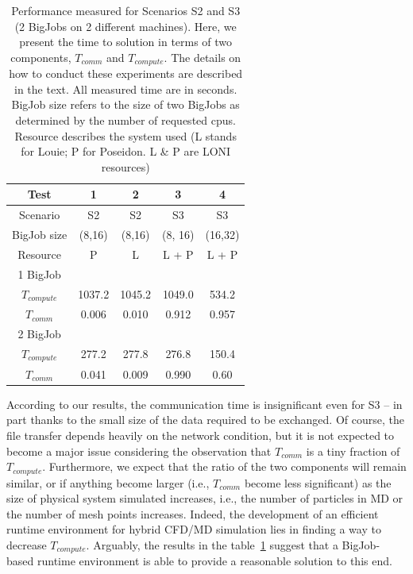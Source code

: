 \documentclass[conference,final]{IEEEtran}
\newcommand{\jhanote}[1]{ {\textcolor{red} { ***Jha: #1 }}}
\newcommand{\jhanote}[1]{}
\begin{document}
\begin{table}[!h]
\begin{center}
  \caption{\small Performance measured for Scenarios S2 and S3 (2
    BigJobs on 2 different machines).  Here, we present the time to
    solution in terms of two components, ${T_{comm}}$ and
   ${T_{compute}}$.  The details on how to conduct these experiments
    are described in the text.  All measured time are in seconds.
    BigJob size refers to the size of two BigJobs as determined by the
    number of requested cpus. Resource describes the system used (L
    stands for Louie; P for Poseidon. L \& P are LONI resources) }
\label{table:TwoBigJobs}
\begin{tabular}{ c || c  c  c  c}
\hline
Test & 1 & 2 & 3 & 4  \\

\hline
Scenario & S2 & S2 & S3 & S3 \\
BigJob size & (8,16)  & (8,16) & (8, 16) & (16,32) \\
Resource & P  & L  &  L + P & L + P \\
\hline
1 BigJob &   & & & \\
${T_{compute}}$ & 1037.2& 1045.2 & 1049.0 & 534.2\\
${T_{comm}}$ & 0.006 & 0.010 & 0.912 & 0.957 \\
\hline
2 BigJob  &   & & & \\
${T_{compute}}$ & 277.2 & 277.8& 276.8 & 150.4 \\
${T_{comm}}$ & 0.041 & 0.009 &  0.990 & 0.60 \\
\hline
\end{tabular}
\end{center}
\end{table}


According to our results, the communication time is insignificant even
for S3 -- in part thanks to the small size of the data required to be
exchanged.  Of course, the file transfer depends heavily on the
network condition, but it is not expected to become a major issue
considering the observation that ${T_{comm}}$ is a tiny fraction of
${T_{compute}}$.  Furthermore, we expect that the ratio of the two
components will remain similar, or if anything become larger (i.e.,
${T_{comm}}$ become less significant) as the size of physical system
simulated increases, i.e., the number of particles in MD or the number
of mesh points increases.  Indeed, the development of an efficient
runtime environment for hybrid CFD/MD simulation lies in finding a way
to decrease ${T_{compute}}$.  Arguably, the results in the
table~\ref{table:TwoBigJobs} suggest that a BigJob-based runtime
environment is able to provide a reasonable solution to this end.
\end{document}
